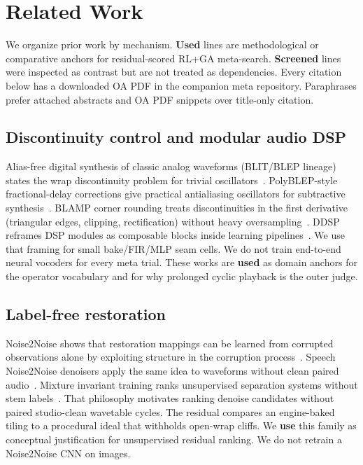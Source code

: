 \section{Related Work}
\label{sec:related_work}

We organize prior work by mechanism.
\textbf{Used} lines are methodological or comparative anchors for residual-scored RL+GA meta-search.
\textbf{Screened} lines were inspected as contrast but are not treated as dependencies.
Every citation below has a downloaded OA PDF in the companion meta repository.
Paraphrases prefer attached abstracts and OA PDF snippets over title-only citation.

\subsection{Discontinuity control and modular audio DSP}
Alias-free digital synthesis of classic analog waveforms (BLIT/BLEP lineage) states the wrap discontinuity problem for trivial oscillators~\cite{stilson1996}.
PolyBLEP-style fractional-delay corrections give practical antialiasing oscillators for subtractive synthesis~\cite{nam2009polyblep}.
BLAMP corner rounding treats discontinuities in the first derivative (triangular edges, clipping, rectification) without heavy oversampling~\cite{esqueda2016blamp}.
DDSP reframes DSP modules as composable blocks inside learning pipelines~\cite{engel2020}.
We use that framing for small bake/FIR/MLP seam cells.
We do not train end-to-end neural vocoders for every meta trial.
These works are \textbf{used} as domain anchors for the operator vocabulary and for why prolonged cyclic playback is the outer judge.

\subsection{Label-free restoration}
Noise2Noise shows that restoration mappings can be learned from corrupted observations alone by exploiting structure in the corruption process~\cite{lehtinen2018}.
Speech Noise2Noise denoisers apply the same idea to waveforms without clean paired audio~\cite{kashyap2021n2n}.
Mixture invariant training ranks unsupervised separation systems without stem labels~\cite{wisdom2020}.
That philosophy motivates ranking denoise candidates without paired studio-clean wavetable cycles.
The residual compares an engine-baked tiling to a procedural ideal that withholds open-wrap cliffs.
We \textbf{use} this family as conceptual justification for unsupervised residual ranking.
We do not retrain a Noise2Noise CNN on images.

